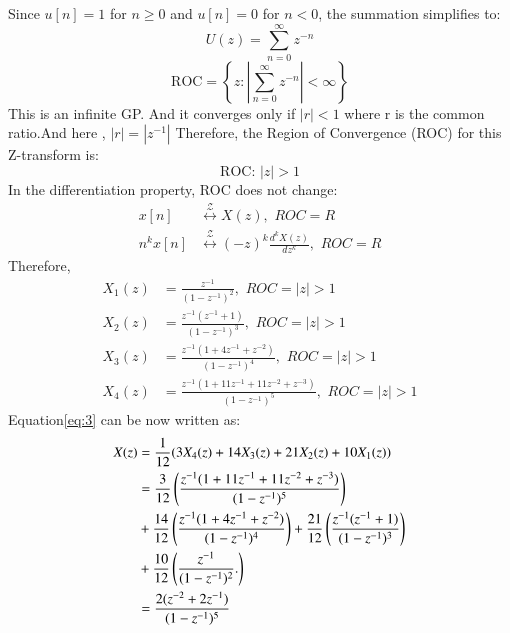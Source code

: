 \documentclass[journal,12pt,twocolumn]{IEEEtran}
\theoremstyle{remark}
\begin{document}
\begin{enumerate}[label=\alph*)]
Since \(u[n] = 1\) for \(n \geq 0\) and \(u[n] = 0\) for \(n < 0\), the summation simplifies to:
\begin{equation}\label{eq:z_transform_simplified}
    U(z) = \sum_{n=0}^{\infty} z^{-n}
\end{equation}
\begin{equation}
    \text{ROC} = \left\{ z : \left| \sum_{n=0}^{\infty} z^{-n} \right| < \infty \right\}
\end{equation}
This is an infinite GP. And it converges only if $|r|<1$ where r is the common ratio.And here , $|r|=|z^{-1}|$ Therefore,
the Region of Convergence (ROC) for this Z-transform is:
\begin{equation}\label{eq:roc}
    \text{ROC: } |z| > 1
\end{equation}
In the differentiation property, ROC does not change:\\
\begin{align}
x[n] &\stackrel{\mathcal{Z}}{\longleftrightarrow} X(z),\hspace{4pt} ROC = R\\
n^k x[n] &\stackrel{\mathcal{Z}}{\longleftrightarrow} (-z)^k \frac{d^kX(z)}{dz^k},\hspace{4pt} ROC = R 
\end{align}
Therefore,
\begin{align}
    X_1(z) &= \frac{z^{-1}}{(1-z^{-1})^2} , \hspace{4pt} ROC=|z|>1\\
    X_2(z) &= \frac{z^{-1}(z^{-1}+1)}{(1-z^{-1})^3} , \hspace{4pt} ROC=|z|>1\\
    X_3(z) &= \frac{z^{-1}(1+4z^{-1}+z^{-2})}{(1-z^{-1})^4}, \hspace{4pt} ROC=|z|>1\\
    X_4(z) &= \frac{z^{-1}(1+11z^{-1}+11z^{-2}+z^{-3})}{(1-z^{-1})^5}, \hspace{4pt} ROC=|z|>1
\end{align}
Equation\eqref{eq:3} can be now written as:
\begin{align}
    X(z) &=\frac{1}{12}(3X_4(z) + 14X_3(z) + 21X_2(z) + 10X_1(z)) \\
         &= \frac{3}{12}\left(\frac{z^{-1}(1+11z^{-1}+11z^{-2}+z^{-3})}{(1-z^{-1})^5}\right)\\ &+ \frac{14}{12}\left(\frac{z^{-1}(1+4z^{-1}+z^{-2})}{(1-z^{-1})^4}\right) 
         + \frac{21}{12}\left(\frac{z^{-1}(z^{-1}+1)}{(1-z^{-1})^3}\right)\notag \\ &+ \frac{10}{12}\left(\frac{z^{-1}}{(1-z^{-1})^2}.\right)\notag \\
         &= \frac{2(z^{-2}+2z^{-1})}{(1-z^{-1})^5}
\end{align}


\end{enumerate}
\end{document}
